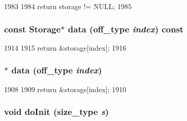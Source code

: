 \begin{DoxyCode}
1983     {
1984         return storage != NULL;
1985     }
\end{DoxyCode}
\hypertarget{classStats_1_1VectorDistBase_a53a38df6a99d518a4016d9635235cc44}{
\subsubsection[{data}]{\setlength{\rightskip}{0pt plus 5cm}const {\bf Storage}$\ast$ data ({\bf off\_\-type} {\em index}) const}}
\label{classStats_1_1VectorDistBase_a53a38df6a99d518a4016d9635235cc44}



\begin{DoxyCode}
1914     {
1915         return &storage[index];
1916     }
\end{DoxyCode}
\hypertarget{classStats_1_1VectorDistBase_ad9077db0c8f34051d2e7766c947aa7b2}{
\subsubsection[{data}]{$\ast$ data ({\bf off\_\-type} {\em index})}}
\label{classStats_1_1VectorDistBase_ad9077db0c8f34051d2e7766c947aa7b2}



\begin{DoxyCode}
1908     {
1909         return &storage[index];
1910     }
\end{DoxyCode}
\hypertarget{classStats_1_1VectorDistBase_a66947ebf8d14cd3e1f7bfc4c5b4227f4}{
\subsubsection[{doInit}]{\setlength{\rightskip}{0pt plus 5cm}void doInit ({\bf size\_\-type} {\em s})}}
\label{classStats_1_1VectorDistBase_a66947ebf8d14cd3e1f7bfc4c5b4227f4}



